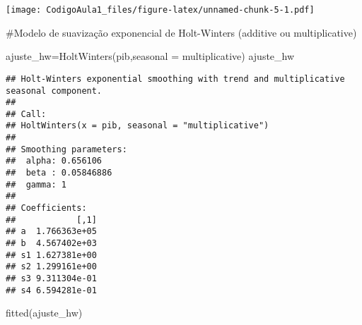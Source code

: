 \documentclass[
]{article}
\newenvironment{Shaded}{\begin{snugshade}}{\end{snugshade}}
\newcommand{\AttributeTok}[1]{\textcolor[rgb]{0.77,0.63,0.00}{#1}}
\newcommand{\FunctionTok}[1]{\textcolor[rgb]{0.00,0.00,0.00}{#1}}
\newcommand{\NormalTok}[1]{#1}
\newcommand{\OtherTok}[1]{\textcolor[rgb]{0.56,0.35,0.01}{#1}}
\newcommand{\StringTok}[1]{\textcolor[rgb]{0.31,0.60,0.02}{#1}}
\begin{document}
\texttt{[image: CodigoAula1\_files/figure-latex/unnamed-chunk-5-1.pdf]}

\#Modelo de suavização exponencial de Holt-Winters (additive ou
multiplicative)

\begin{Shaded}
\begin{Highlighting}[]
\NormalTok{ajuste\_hw}\OtherTok{=}\FunctionTok{HoltWinters}\NormalTok{(pib,}\AttributeTok{seasonal =} \StringTok{\textquotesingle{}multiplicative\textquotesingle{}}\NormalTok{)}
\NormalTok{ajuste\_hw}
\end{Highlighting}
\end{Shaded}

\begin{verbatim}
## Holt-Winters exponential smoothing with trend and multiplicative seasonal component.
## 
## Call:
## HoltWinters(x = pib, seasonal = "multiplicative")
## 
## Smoothing parameters:
##  alpha: 0.656106
##  beta : 0.05846886
##  gamma: 1
## 
## Coefficients:
##            [,1]
## a  1.766363e+05
## b  4.567402e+03
## s1 1.627381e+00
## s2 1.299161e+00
## s3 9.311304e-01
## s4 6.594281e-01
\end{verbatim}

\begin{Shaded}
\begin{Highlighting}[]
\FunctionTok{fitted}\NormalTok{(ajuste\_hw)}
\end{Highlighting}
\end{Shaded}
\end{document}
